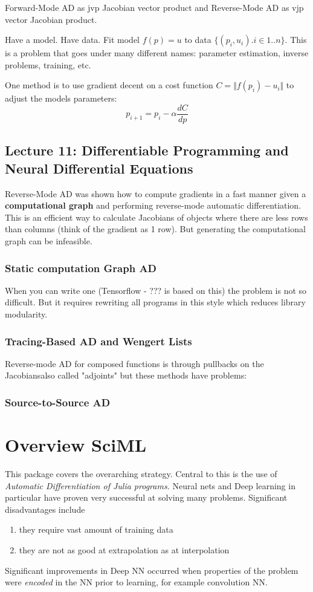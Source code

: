 Forward-Mode AD as jvp Jacobian vector product and Reverse-Mode AD as vjp vector Jacobian  product.

Have a model. Have data. Fit model $f(p)= u$ to data $\{(p_i,u_i).i\in 1..n\}$.
This is a problem that goes under many different names: parameter estimation, inverse problems, training, etc.

One method is to use gradient decent on a cost function $C=\Vert f(p_i) - u_i \Vert$  to adjust the models parameters:
\[p_{i+1} = p_i -\alpha \frac{dC}{dp}\]


\subsection{Lecture 11: Differentiable Programming and Neural Differential Equations}

Reverse-Mode AD was shown how to  compute gradients in a fast manner given a {\bf computational graph} and performing reverse-mode automatic differentiation. This is an efficient way to calculate Jacobians of objects where there are less rows than columns (think of the gradient as 1 row). But generating the computational graph can be infeasible.

 
\subsubsection{Static computation Graph AD} 
 When you can write one (Tensorflow - ???  is based on this) the problem is not so difficult. But it requires rewriting all programs in this style which reduces library modularity.
 
 \subsubsection{Tracing-Based AD and Wengert Lists}
 Reverse-mode AD for composed functions is through pullbacks on the Jacobiansalso called "adjoints" but these methods have problems: 
 
 \subsubsection{Source-to-Source AD}
 
 
  
\section{Overview SciML}
  This package covers the overarching strategy. Central to this is the use of \emph{Automatic Differentiation of Julia programs.}
  Neural nets and Deep learning in particular have proven very successful at solving many problems. Significant  disadvantages include
  \begin{enumerate}
  \item they require vast amount of training data
  \item they are not as good at extrapolation as at interpolation
\end{enumerate}    
Significant improvements in Deep NN occurred when properties of the problem were \emph{encoded} in the NN prior to learning, for example convolution NN.

